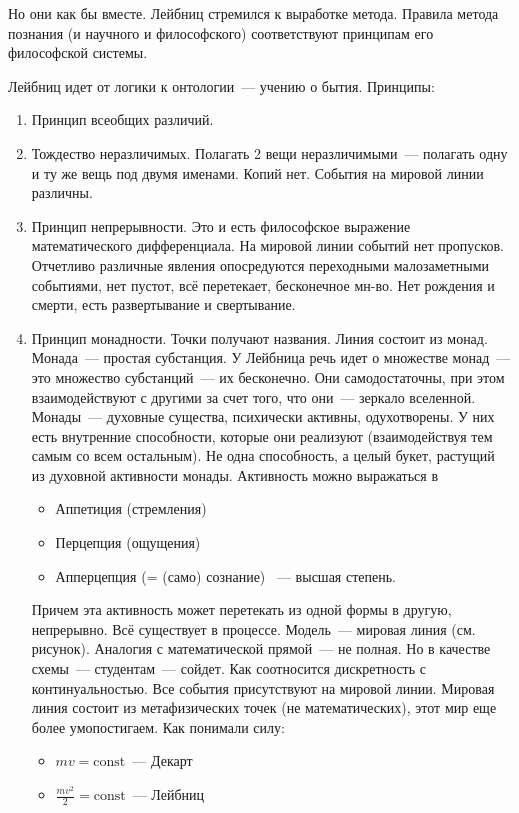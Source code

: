 Но они как бы вместе. Лейбниц стремился к выработке метода. Правила метода познания (и научного и философского) соответствуют принципам его философской системы.

Лейбниц идет от логики к онтологии~--- учению о бытия. Принципы:
\begin{enumerate}
	\item Принцип всеобщих различий. 
	\item Тождество неразличимых. Полагать 2 вещи неразличимыми~--- полагать одну и ту же вещь под двумя именами. Копий нет. События на мировой линии различны. 
	\item Принцип непрерывности. Это и есть философское выражение математического дифференциала. На мировой линии событий нет пропусков. Отчетливо различные явления опосредуются переходными малозаметными событиями, нет пустот, всё перетекает, бесконечное мн-во. Нет рождения и смерти, есть развертывание и свертывание. 
	\item Принцип монадности. Точки получают названия. Линия состоит из монад. Монада~--- простая субстанция. У Лейбница речь идет о множестве монад~--- это множество субстанций~--- их бесконечно. Они самодостаточны, при этом взаимодействуют с другими за счет того, что они~--- зеркало вселенной. Монады~--- духовные существа, психически активны, одухотворены. У них есть внутренние способности, которые они реализуют (взаимодействуя тем самым со всем остальным). Не одна способность, а целый букет, растущий из духовной активности монады. Активность можно выражаться в 
	\begin{itemize}
		\item Аппетиция (стремления) 
		\item Перцепция (ощущения) 
		\item Апперцепция (= (само) сознание) ~--- высшая степень.
	\end{itemize}
	Причем эта активность может перетекать из одной формы в другую, непрерывно. 
	Всё существует в процессе. 
	Модель~--- мировая линия (см. рисунок). Аналогия с математической прямой~--- не полная. Но в качестве схемы~--- студентам~--- сойдет. Как соотносится дискретность с континуальностью. Все события присутствуют на мировой линии. Мировая линия состоит из метафизических точек (не математических), этот мир еще более умопостигаем.
	Как понимали силу:
	\begin{itemize}
		\item $mv=\text{const}$~--- Декарт
		\item $\frac{mv^2}2=\text{const}$~--- Лейбниц
	\end{itemize}

\end{enumerate}

